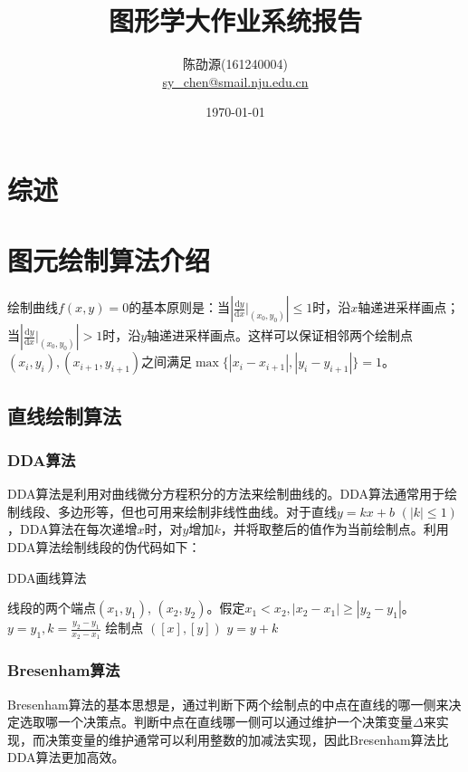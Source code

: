 \documentclass[a4paper,12pt]{article}
\title{图形学大作业系统报告}
\author{陈劭源(161240004) \\ \href{mailto:sy\_chen@smail.nju.edu.cn}{sy\_chen@smail.nju.edu.cn}}
\date{\today}
\begin{document}
\maketitle

\section{综述}



\section{图元绘制算法介绍}
绘制曲线$f(x,y) = 0$的基本原则是：当$\left|\frac{\mathrm{d}y}{\mathrm{d}x} \big|_{(x_0, y_0)} \right| \leq 1$时，沿$x$轴递进采样画点；当$\left|\frac{\mathrm{d}y}{\mathrm{d}x} \big|_{(x_0, y_0)} \right| > 1$时，沿$y$轴递进采样画点。这样可以保证相邻两个绘制点$(x_i, y_i), (x_{i+1}, y_{i+1})$之间满足$\max\{|x_i - x_{i+1}|, |y_i - y_{i+1}|\} = 1$。

\subsection{直线绘制算法}

\subsubsection{DDA算法}

DDA算法是利用对曲线微分方程积分的方法来绘制曲线的。DDA算法通常用于绘制线段、多边形等，但也可用来绘制非线性曲线\cite{wiki:DDA}。对于直线$y = kx + b$ $(|k| \leq 1)$，DDA算法在每次递增$x$时，对$y$增加$k$，并将取整后的值作为当前绘制点。利用DDA算法绘制线段的伪代码如下：

\begin{algorithm}[htb] 
\caption{DDA画线算法} 
\label{alg:DDA} 
\begin{algorithmic}[1] 
\Require 
线段的两个端点$(x_1, y_1)$, $(x_2, y_2)$。假定$x_1 < x_2, |x_2 - x_1| \geq |y_2 - y_1|$。
\State $y = y_1, k = \frac{y_2 - y_1}{x_2 - x_1}$
    \State 绘制点 $([x], [y])$
    \State $y = y + k$
\EndFor
\end{algorithmic} 
\end{algorithm}

\subsubsection{Bresenham算法}

Bresenham算法的基本思想是，通过判断下两个绘制点的中点在直线的哪一侧来决定选取哪一个决策点。判断中点在直线哪一侧可以通过维护一个决策变量$\Delta$来实现，而决策变量的维护通常可以利用整数的加减法实现\cite{wiki:Bresenham}，因此Bresenham算法比DDA算法更加高效。
\end{document}
